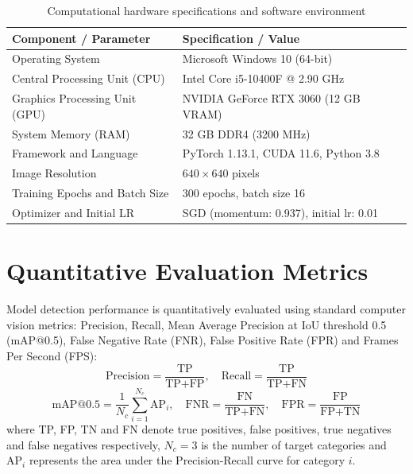 \documentclass[12pt,a4paper]{report}
\begin{document}
\begin{table}[H]
\centering
\caption{Computational hardware specifications and software environment}
\label{tab:hardware_software}
\vspace{0.2cm}
\setlength{\tabcolsep}{8pt}
\renewcommand{\arraystretch}{1.15}
\small
\begin{tabular}{|l|l|}
\hline
\textbf{Component / Parameter} & \textbf{Specification / Value} \\
\hline
Operating System & Microsoft Windows 10 (64-bit) \\
\hline
Central Processing Unit (CPU) & Intel Core i5-10400F @ 2.90 GHz \\
\hline
Graphics Processing Unit (GPU) & NVIDIA GeForce RTX 3060 (12 GB VRAM) \\
\hline
System Memory (RAM) & 32 GB DDR4 (3200 MHz) \\
\hline
Framework and Language & PyTorch 1.13.1, CUDA 11.6, Python 3.8 \\
\hline
Image Resolution & $640 \times 640$ pixels \\
\hline
Training Epochs and Batch Size & 300 epochs, batch size 16 \\
\hline
Optimizer and Initial LR & SGD (momentum: 0.937), initial lr: 0.01 \\
\hline
\end{tabular}
\end{table}

\section{Quantitative Evaluation Metrics}

Model detection performance is quantitatively evaluated using standard computer vision metrics: Precision, Recall, Mean Average Precision at IoU threshold 0.5 (mAP@0.5), False Negative Rate (FNR), False Positive Rate (FPR) and Frames Per Second (FPS):
\begin{equation}
\text{Precision} = \frac{\text{TP}}{\text{TP} + \text{FP}}, \quad \text{Recall} = \frac{\text{TP}}{\text{TP} + \text{FN}}
\end{equation}
\begin{equation}
\text{mAP@0.5} = \frac{1}{N_c} \sum_{i=1}^{N_c} \text{AP}_i, \quad \text{FNR} = \frac{\text{FN}}{\text{TP} + \text{FN}}, \quad \text{FPR} = \frac{\text{FP}}{\text{FP} + \text{TN}}
\end{equation}
where TP, FP, TN and FN denote true positives, false positives, true negatives and false negatives respectively, $N_c = 3$ is the number of target categories and $\text{AP}_i$ represents the area under the Precision-Recall curve for category $i$.
\end{document}
